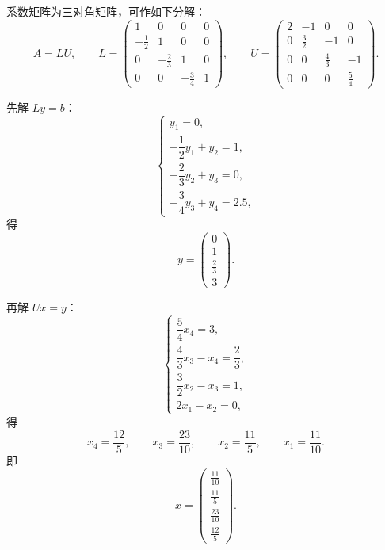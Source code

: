 \documentclass[11pt, a4paper]{ctexart}
\begin{document}
\begin{solution}
    系数矩阵为三对角矩阵，可作如下分解：
    \[
        A = LU,
        \qquad
        L =
        \begin{pmatrix}
            1 & 0 & 0 & 0 \\
            -\frac{1}{2} & 1 & 0 & 0 \\
            0 & -\frac{2}{3} & 1 & 0 \\
            0 & 0 & -\frac{3}{4} & 1
        \end{pmatrix},
        \qquad
        U =
        \begin{pmatrix}
            2 & -1 & 0 & 0 \\
            0 & \frac{3}{2} & -1 & 0 \\
            0 & 0 & \frac{4}{3} & -1 \\
            0 & 0 & 0 & \frac{5}{4}
        \end{pmatrix}.
    \]

    先解 $Ly = b$：
    \[
        \begin{cases}
            y_1 = 0, \\
            -\dfrac{1}{2} y_1 + y_2 = 1, \\
            -\dfrac{2}{3} y_2 + y_3 = 0, \\
            -\dfrac{3}{4} y_3 + y_4 = 2.5,
        \end{cases}
    \]
    得
    \[
        y =
        \begin{pmatrix}
            0 \\
            1 \\
            \frac{2}{3} \\
            3
        \end{pmatrix}.
    \]

    再解 $Ux = y$：
    \[
        \begin{cases}
            \dfrac{5}{4}x_4 = 3, \\
            \dfrac{4}{3}x_3 - x_4 = \dfrac{2}{3}, \\
            \dfrac{3}{2}x_2 - x_3 = 1, \\
            2x_1 - x_2 = 0,
        \end{cases}
    \]
    得
    \[
        x_4 = \frac{12}{5},\qquad
        x_3 = \frac{23}{10},\qquad
        x_2 = \frac{11}{5},\qquad
        x_1 = \frac{11}{10}.
    \]
    即
    \[
        x =
        \begin{pmatrix}
            \frac{11}{10} \\
            \frac{11}{5} \\
            \frac{23}{10} \\
            \frac{12}{5}
        \end{pmatrix}.
    \]
\end{solution}
\end{document}
